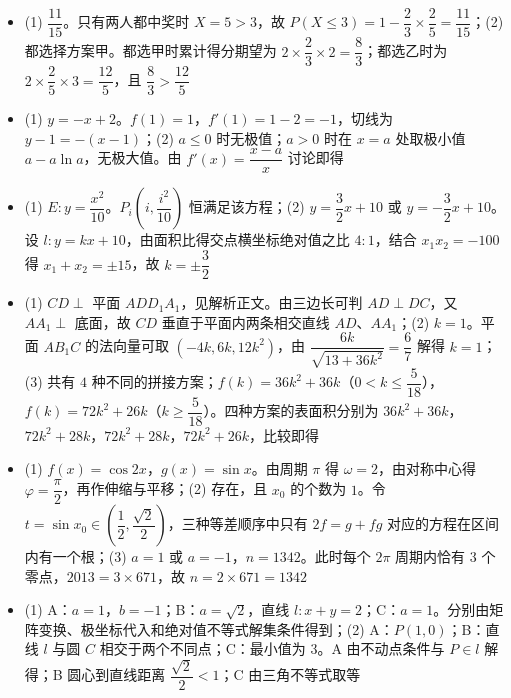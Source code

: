 \begin{itemize}[leftmargin=2.6em]
  \item[\textbf{16.}] (1) $\dfrac{11}{15}$。只有两人都中奖时 $X=5>3$，故 $P(X\leqslant3)=1-\dfrac23\times\dfrac25=\dfrac{11}{15}$；(2) 都选择方案甲。都选甲时累计得分期望为 $2\times\dfrac23\times2=\dfrac83$；都选乙时为 $2\times\dfrac25\times3=\dfrac{12}{5}$，且 $\dfrac83>\dfrac{12}{5}$
  \item[\textbf{17.}] (1) $y=-x+2$。$f(1)=1$，$f'(1)=1-2=-1$，切线为 $y-1=-(x-1)$；(2) $a\leqslant0$ 时无极值；$a>0$ 时在 $x=a$ 处取极小值 $a-a\ln a$，无极大值。由 $f'(x)=\dfrac{x-a}{x}$ 讨论即得
  \item[\textbf{18.}] (1) $E:y=\dfrac{x^2}{10}$。$P_i\left(i,\dfrac{i^2}{10}\right)$ 恒满足该方程；(2) $y=\dfrac32x+10$ 或 $y=-\dfrac32x+10$。设 $l:y=kx+10$，由面积比得交点横坐标绝对值之比 $4:1$，结合 $x_1x_2=-100$ 得 $x_1+x_2=\pm15$，故 $k=\pm\dfrac32$
  \item[\textbf{19.}] (1) $CD\perp$ 平面 $ADD_1A_1$，见解析正文。由三边长可判 $AD\perp DC$，又 $AA_1\perp$ 底面，故 $CD$ 垂直于平面内两条相交直线 $AD$、$AA_1$；(2) $k=1$。平面 $AB_1C$ 的法向量可取 $(-4k,6k,12k^2)$，由 $\dfrac{6k}{\sqrt{13+36k^2}}=\dfrac67$ 解得 $k=1$；(3) 共有 $4$ 种不同的拼接方案；$f(k)=36k^2+36k$（$0<k\leqslant\dfrac5{18}$），$f(k)=72k^2+26k$（$k\geqslant\dfrac5{18}$）。四种方案的表面积分别为 $36k^2+36k$，$72k^2+28k$，$72k^2+28k$，$72k^2+26k$，比较即得
  \item[\textbf{20.}] (1) $f(x)=\cos2x$，$g(x)=\sin x$。由周期 $\pi$ 得 $\omega=2$，由对称中心得 $\varphi=\dfrac\pi2$，再作伸缩与平移；(2) 存在，且 $x_0$ 的个数为 $1$。令 $t=\sin x_0\in\left(\dfrac12,\dfrac{\sqrt2}{2}\right)$，三种等差顺序中只有 $2f=g+fg$ 对应的方程在区间内有一个根；(3) $a=1$ 或 $a=-1$，$n=1342$。此时每个 $2\pi$ 周期内恰有 $3$ 个零点，$2013=3\times671$，故 $n=2\times671=1342$
  \item[\textbf{21.}] (1) A：$a=1$，$b=-1$；B：$a=\sqrt2$，直线 $l:x+y=2$；C：$a=1$。分别由矩阵变换、极坐标代入和绝对值不等式解集条件得到；(2) A：$P(1,0)$；B：直线 $l$ 与圆 $C$ 相交于两个不同点；C：最小值为 $3$。A 由不动点条件与 $P\in l$ 解得；B 圆心到直线距离 $\dfrac{\sqrt2}{2}<1$；C 由三角不等式取等
\end{itemize}
